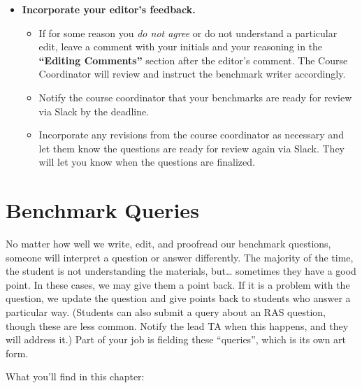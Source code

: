 \documentclass[
]{article}
\providecommand{\tightlist}{%
  \setlength{\itemsep}{0pt}\setlength{\parskip}{0pt}}
\begin{document}
\begin{itemize}
\tightlist
\item
  \textbf{Incorporate your editor's feedback.}

  \begin{itemize}
  \tightlist
  \item
    If for some reason you \emph{do not agree} or do not understand a particular edit, leave a comment with your initials and your reasoning in the \textbf{``Editing Comments''} section after the editor's comment. The Course Coordinator will review and instruct the benchmark writer accordingly.\\
  \item
    Notify the course coordinator that your benchmarks are ready for review via Slack by the deadline.\\
  \item
    Incorporate any revisions from the course coordinator as necessary and let them know the questions are ready for review again via Slack. They will let you know when the questions are finalized.
  \end{itemize}
\end{itemize}

\hypertarget{benchmark-queries}{%
\section{Benchmark Queries}\label{benchmark-queries}}

No matter how well we write, edit, and proofread our benchmark questions, someone will interpret a question or answer differently. The majority of the time, the student is not understanding the materials, but\ldots{} sometimes they have a good point. In these cases, we may give them a point back. If it is a problem with the question, we update the question and give points back to students who answer a particular way. (Students can also submit a query about an RAS question, though these are less common. Notify the lead TA when this happens, and they will address it.) Part of your job is fielding these ``queries'', which is its own art form.

What you'll find in this chapter:
\end{document}
